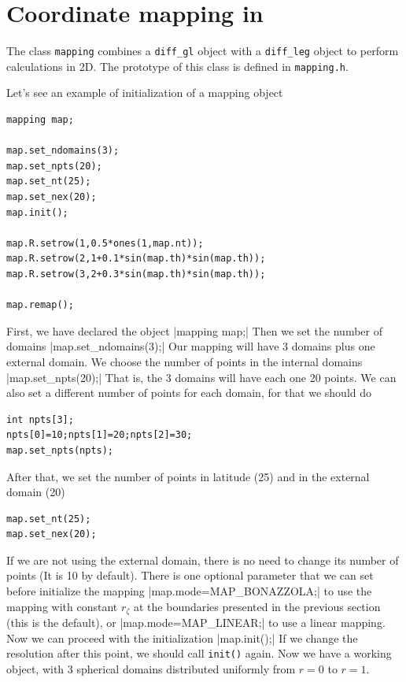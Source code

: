 \pagebreak

\section{Coordinate mapping in \ester}

The class \verb|mapping| combines a \verb|diff_gl| object with a \verb|diff_leg| object to perform 
calculations in 2D. The prototype of this class is defined in \verb|mapping.h|.

Let's see an example of initialization of a mapping object

\begin{verbatim}
mapping map;

map.set_ndomains(3);
map.set_npts(20);
map.set_nt(25);
map.set_nex(20);
map.init();

map.R.setrow(1,0.5*ones(1,map.nt));
map.R.setrow(2,1+0.1*sin(map.th)*sin(map.th));
map.R.setrow(3,2+0.3*sin(map.th)*sin(map.th));

map.remap();

\end{verbatim} 
First, we have declared the object
|mapping map;|
Then we set the number of domains
|map.set_ndomains(3);|
Our mapping will have 3 domains plus one external domain. We choose the number of points in the internal
domains
|map.set_npts(20);|
That is, the 3 domains will have each one 20 points. We can also set a different number of points for
each domain, for that we should do
\begin{verbatim}
int npts[3];
npts[0]=10;npts[1]=20;npts[2]=30;
map.set_npts(npts);
\end{verbatim}
After that, we set the number of points in latitude (25) and in the external domain (20)
\begin{verbatim}
map.set_nt(25);
map.set_nex(20);
\end{verbatim}
If we are not using the external domain, there is no need to change its number of points (It is 10 by default).
There is one optional parameter that we can set before initialize the mapping
|map.mode=MAP_BONAZZOLA;|
to use the mapping with constant $r_\zeta$ at the boundaries presented in the previous section (this is
the default), or
|map.mode=MAP_LINEAR;|
to use a linear mapping. Now we can proceed with the initialization
|map.init();|
If we change the resolution after this point, we should call \verb|init()| again. Now
we have a working object, with 3 spherical domains distributed uniformly from $r=0$ to $r=1$.
